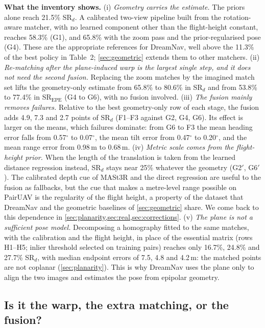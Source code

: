 \documentclass[10pt,twocolumn,letterpaper]{article}
\newcommand{\SRd}{SR$_{d}$}
\newcommand{\SRe}{SR$_{\mathrm{EPE}}$}
\begin{document}
\noindent\textbf{What the inventory shows.}
(i) \emph{Geometry carries the estimate.} The priors alone reach 21.5\% \SRd{}. A calibrated two-view pipeline built from the rotation-aware matcher, with no learned component other than the flight-height constant, reaches 58.3\% (G1), and 65.8\% with the zoom pass and the prior-regularised pose (G4). These are the appropriate references for DreamNav, well above the 11.3\% of the best policy in Table~2; \cref{sec:geometric} extends them to other matchers.
(ii) \emph{Re-matching after the plane-induced warp is the largest single step, and it does not need the second fusion.} Replacing the zoom matches by the imagined match set lifts the geometry-only estimate from 65.8\% to 80.6\% in \SRd{} and from 53.8\% to 77.4\% in \SRe{} (G4 to G6), with no fusion involved.
(iii) \emph{The fusion mainly removes failures.} Relative to the best geometry-only row of each stage, the fusion adds 4.9, 7.3 and 2.7 points of \SRd{} (F1--F3 against G2, G4, G6). Its effect is larger on the means, which failures dominate: from G6 to F3 the mean heading error falls from 0.57$^\circ$ to 0.07$^\circ$, the mean tilt error from 0.47$^\circ$ to 0.20$^\circ$, and the mean range error from 0.98\,m to 0.68\,m.
(iv) \emph{Metric scale comes from the flight-height prior.} When the length of the translation is taken from the learned distance regression instead, \SRd{} stays near 25\% whatever the geometry (G2$'$, G6$'$). The calibrated depth cue of MASt3R and the direct regression are useful to the fusion as fallbacks, but the cue that makes a metre-level range possible on PairUAV is the regularity of the flight height, a property of the dataset that DreamNav and the geometric baselines of \cref{sec:geometric} share. We come back to this dependence in \cref{sec:planarity,sec:real,sec:corrections}.
(v) \emph{The plane is not a sufficient pose model.} Decomposing a homography fitted to the same matches, with the calibration and the flight height, in place of the essential matrix (rows H1--H5; inlier threshold selected on training pairs) reaches only 16.7\%, 24.8\% and 27.7\% \SRd, with median endpoint errors of 7.5, 4.8 and 4.2\,m: the matched points are not coplanar (\cref{sec:planarity}). This is why DreamNav uses the plane only to align the two images and estimates the pose from epipolar geometry.

\subsection{Is it the warp, the extra matching, or the fusion?}
\label{sec:controls}
\end{document}
